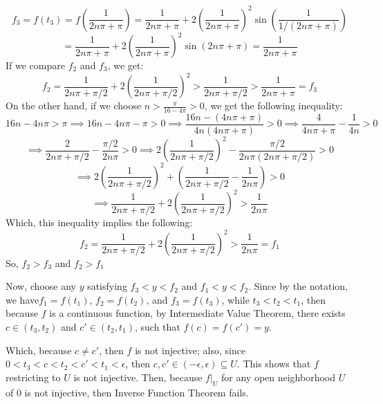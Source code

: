 \documentclass{article}
\begin{document}
$$f_3=f(t_3) = f\left(\frac{1}{2n\pi +\pi}\right)=\frac{1}{2n\pi +\pi}+2\left(\frac{1}{2n\pi +\pi}\right)^2\sin\left(\frac{1}{1/(2n\pi +\pi)}\right)$$
$$=\frac{1}{2n\pi +\pi}+2\left(\frac{1}{2n\pi +\pi}\right)^2\sin(2n\pi+\pi)=\frac{1}{2n\pi +\pi}$$
If we compare $f_2$ and $f_3$, we get:
$$f_2=\frac{1}{2n\pi +\pi/2}+2\left(\frac{1}{2n\pi +\pi/2}\right)^2>\frac{1}{2n\pi +\pi/2}>\frac{1}{2n\pi +\pi}=f_3$$
On the other hand, if we choose $n>\frac{\pi}{16-4\pi}>0$, we get the following inequality:
$$16n-4n\pi > \pi\implies 16n -4n\pi -\pi>0\implies \frac{16n -(4n\pi +\pi)}{4n(4n\pi +\pi)}>0 \implies \frac{4}{4n\pi +\pi}-\frac{1}{4n}>0 $$
$$\implies \frac{2}{2n\pi + \pi/2}-\frac{\pi/2}{2n\pi}>0 \implies 2\left(\frac{1}{2n\pi+\pi/2}\right)^2-\frac{\pi/2}{2n\pi(2n\pi+\pi/2)}>0$$
$$\implies 2\left(\frac{1}{2n\pi+\pi/2}\right)^2+\left(\frac{1}{2n\pi+\pi/2}-\frac{1}{2n\pi}\right)>0$$
$$\implies \frac{1}{2n\pi+\pi/2}+2\left(\frac{1}{2n\pi+\pi/2}\right)^2>\frac{1}{2n\pi}$$
Which, this inequality implies the following:
$$f_2 = \frac{1}{2n\pi+\pi/2}+2\left(\frac{1}{2n\pi+\pi/2}\right)^2 >\frac{1}{2n\pi}=f_1$$
So, $f_2>f_3$ and $f_2>f_1$

Now, choose any $y$ satisfying $f_3<y<f_2$ and $f_1<y<f_2$. Since by the notation, we have$f_1=f(t_1)$, $f_2=f(t_2)$, and $f_3=f(t_3)$, while $t_3<t_2<t_1$,
then because $f$ is a continuous function, by Intermediate Value Theorem, there exists $c\in (t_3,t_2)$ and $c'\in (t_2,t_1)$, such that $f(c)=f(c')=y$.

Which, because $c\neq c'$, then $f$ is not injective; also, since $0<t_3<c<t_2<c'<t_1<\epsilon$, then $c,c'\in (-\epsilon,\epsilon)\subseteq U$.
This shows that $f$ restricting to $U$ is not injective. Then, because $f|_U$ for any open neighborhood $U$ of $0$ is not injective, then Inverse Function Theorem fails.

\break
\end{document}
